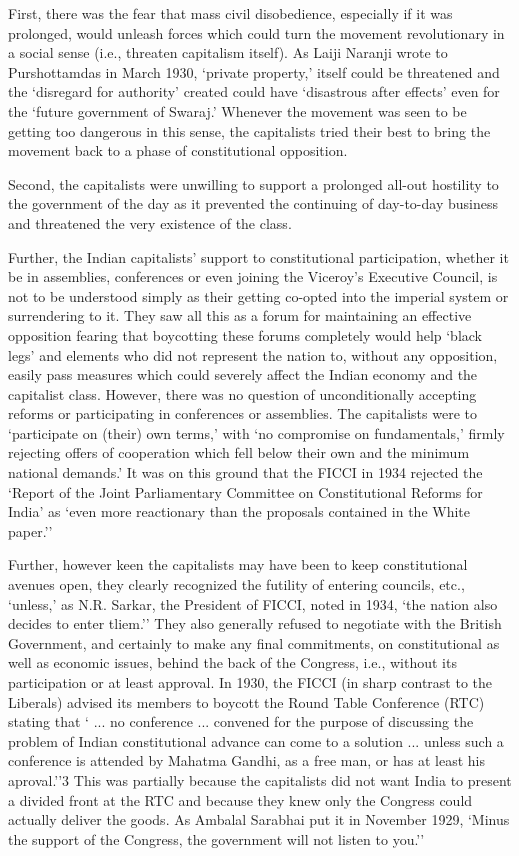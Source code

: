 First, there was the fear that mass civil disobedience, especially if it was prolonged, would unleash forces which could turn the movement revolutionary in a social sense (i.e., threaten capitalism itself). As Laiji Naranji wrote to Purshottamdas in March 1930, `private property,' itself could be threatened and the `disregard for authority' created could have `disastrous after effects' even for the `future government of Swaraj.' Whenever the movement was seen to be getting too dangerous in this sense, the capitalists tried their best to bring the movement back to a phase of constitutional opposition. 

Second, the capitalists were unwilling to support a prolonged all-out hostility to the government of the day as it prevented the continuing of day-to-day business and threatened the very existence of the class. 

Further, the Indian capitalists' support to constitutional participation, whether it be in assemblies, conferences or even joining the Viceroy's Executive Council, is not to be understood simply as their getting co-opted into the imperial system or surrendering to it. They saw all this as a forum for maintaining an effective opposition fearing that boycotting these forums completely would help `black legs' and elements who did not represent the nation to, without any opposition, easily pass measures which could severely affect the Indian economy and the capitalist class. However, there was no question of unconditionally accepting reforms or participating in conferences or assemblies. The capitalists were to `participate on (their) own terms,' with `no compromise on fundamentals,' firmly rejecting offers of cooperation which fell below their own and the minimum national demands.' It was on this ground that the FICCI in 1934 rejected the `Report of the Joint Parliamentary Committee on Constitutional Reforms for India' as `even more reactionary than the proposals contained in the White paper.'' 

Further, however keen the capitalists may have been to keep constitutional avenues open, they clearly recognized the futility of entering councils, etc., `unless,' as N.R. Sarkar, the President of FICCI, noted in 1934, `the nation also decides to enter tliem.'' They also generally refused to negotiate with the British Government, and certainly to make any final commitments, on constitutional as well as economic issues, behind the back of the Congress, i.e., without its participation or at least approval. In 1930, the FICCI (in sharp contrast to the Liberals) advised its members to boycott the Round Table Conference (RTC) stating that ` ... no conference ... convened for the purpose of discussing the problem of Indian constitutional advance can come to a solution ... unless such a conference is attended by Mahatma Gandhi, as a free man, or has at least his aproval.''3 This was partially because the capitalists did not want India to present a divided front at the RTC and because they knew only the Congress could actually deliver the goods. As Ambalal Sarabhai put it in November 1929, `Minus the support of the Congress, the government will not listen to you.'' 

